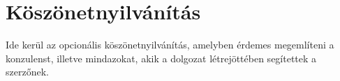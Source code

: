 \chapter*{Köszönetnyilvánítás}
Ide kerül az opcionális köszönetnyilvánítás, amelyben érdemes megemlíteni a konzulenst, illetve mindazokat, akik a dolgozat létrejöttében segítettek a szerzőnek. 